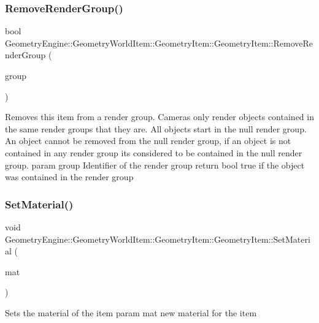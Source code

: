\subsubsection{\texorpdfstring{RemoveRenderGroup()}{RemoveRenderGroup()}}
{\footnotesize\ttfamily bool Geometry\+Engine\+::\+Geometry\+World\+Item\+::\+Geometry\+Item\+::\+Geometry\+Item\+::\+Remove\+Render\+Group (\begin{DoxyParamCaption}\item[{int}]{group }\end{DoxyParamCaption})\hspace{0.3cm}{\ttfamily [virtual]}}

Removes this item from a render group. Cameras only render objects contained in the same render groups that they are. All objects start in the null render group. An object cannot be removed from the null render group, if an object is not contained in any render group it\textquotesingle{}s considered to be contained in the null render group. param group Identifier of the render group return bool true if the object was contained in the render group \mbox{\label{class_geometry_engine_1_1_geometry_world_item_1_1_geometry_item_1_1_geometry_item_addd7b6651de0583209ec45ff1a813dd1}} 
\subsubsection{\texorpdfstring{SetMaterial()}{SetMaterial()}}
{\footnotesize\ttfamily void Geometry\+Engine\+::\+Geometry\+World\+Item\+::\+Geometry\+Item\+::\+Geometry\+Item\+::\+Set\+Material (\begin{DoxyParamCaption}\item[{\mbox{\hyperlink{class_geometry_engine_1_1_geometry_material_1_1_material}{Geometry\+Material\+::\+Material}} $\ast$}]{mat }\end{DoxyParamCaption})\hspace{0.3cm}{\ttfamily [virtual]}}

Sets the material of the item param mat new material for the item \mbox{\label{class_geometry_engine_1_1_geometry_world_item_1_1_geometry_item_1_1_geometry_item_ab2ed6e137c09bd08335452fa4bb7742a}} 
